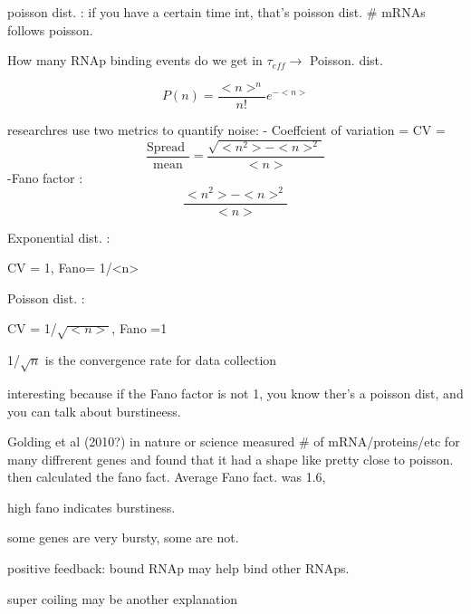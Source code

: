 \documentclass{article}
\begin{document}
poisson dist.  : if you have a certain time int, that's poisson dist. \# mRNAs follows poisson. 

How many RNAp binding events do we get in $\tau_{eff}\longrightarrow$ Poisson. dist. 
	
\begin{equation}
	P(n) = \frac{<n>^n}{n!}e^{-<n>}
\end{equation}

researchres use two metrics to quantify noise: 
- Coeffcient of variation = CV = 
\begin{equation}
	\frac{\text{Spread }}{\text{mean}} = \frac{\sqrt{<n^2> - <n>^2}}{<n>}	
\end{equation}
-Fano factor : 
\begin{equation}
	 \frac{{<n^2> - <n>^2}}{<n>}	
\end{equation}

Exponential dist. :

CV = 1, Fano= 1/<n>

Poisson dist. :

CV = 1/$\sqrt{<n>}$, Fano =1

1/$\sqrt n $ is the convergence rate for data collection

interesting because if the Fano factor is not 1, you know ther's a poisson dist, and you can talk about burstineess. 

Golding et al (2010?) in nature or science measured \# of mRNA/proteins/etc for many diffrerent genes
and found that it had a shape like pretty close to poisson. 
then calculated the fano fact. Average Fano fact. was 1.6, 

high fano indicates burstiness.

some genes are very bursty, some are not. 

positive feedback: bound RNAp may help bind other RNAps. 

super coiling may be another explanation





\end{document}
